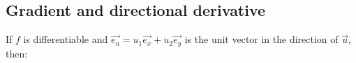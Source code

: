 \documentclass{article}
\begin{document}
\subsection{Gradient and directional derivative}
If $f$ is differentiable and $\overrightarrow{e_u} = u_1\overrightarrow{e_x} + u_2\overrightarrow{e_y}$
is the unit vector in the direction of $\overrightarrow{u}$, then:
\end{document}
